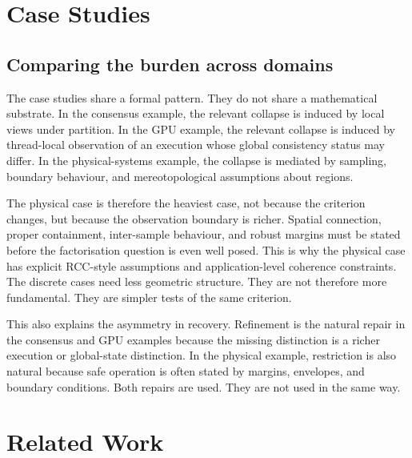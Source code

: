 \documentclass[a4paper,11pt]{article}
\begin{document}
\section{Case Studies}
\label{sec:casestudies}



\subsection{Comparing the burden across domains}
\label{subsec:domain-burden}

The case studies share a formal pattern. They do not share a mathematical
substrate. In the consensus example, the relevant collapse is induced by local
views under partition. In the GPU example, the relevant collapse is induced by
thread-local observation of an execution whose global consistency status may
differ. In the physical-systems example, the collapse is mediated by sampling,
boundary behaviour, and mereotopological assumptions about regions.

The physical case is therefore the heaviest case, not because the criterion
changes, but because the observation boundary is richer. Spatial connection,
proper containment, inter-sample behaviour, and robust margins must be stated
before the factorisation question is even well posed. This is why the physical
case has explicit RCC-style assumptions and application-level coherence
constraints. The discrete cases need less geometric structure. They are not
therefore more fundamental. They are simpler tests of the same criterion.

This also explains the asymmetry in recovery. Refinement is the natural repair
in the consensus and GPU examples because the missing distinction is a richer
execution or global-state distinction. In the physical example, restriction is
also natural because safe operation is often stated by margins, envelopes, and
boundary conditions. Both repairs are used. They are not used in the same way.

\section{Related Work}
\label{sec:related}
\end{document}
